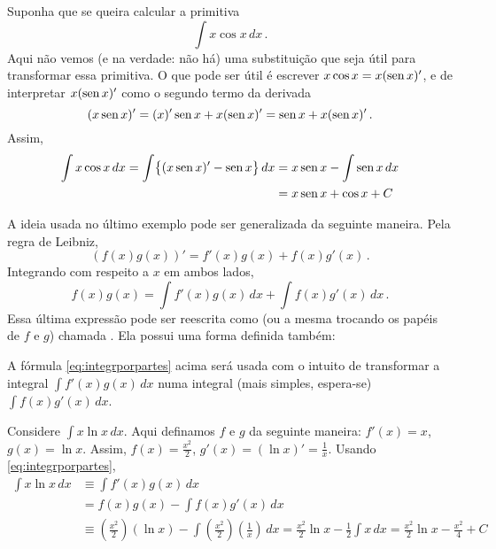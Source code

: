 \begin{ex}
Suponha que se queira calcular a primitiva
$$\int x\cos x\,dx\,.$$
Aqui não vemos (e na verdade: não há) uma substituição que seja útil para
transformar essa primitiva.
O que pode ser útil é escrever $x\cos x=x(\operatorname{sen} x)'$, e de interpretar
$x(\operatorname{sen} x)'$ como o segundo termo da derivada
$$(x\operatorname{sen} x)'=(x)'\operatorname{sen} x+x(\operatorname{sen} x)'=\operatorname{sen} x+x(\operatorname{sen} x)'\,.$$
Assim,
\begin{align*}
\int x\cos x\,dx=\int\bigl\{(x\operatorname{sen} x)'-\operatorname{sen} x\bigr\}\,dx&=
x\operatorname{sen} x-\int\operatorname{sen} x\,dx\\
&=x\operatorname{sen} x+\cos x+C
\end{align*}
\end{ex}
A ideia usada no último exemplo pode ser generalizada da seguinte maneira. Pela
regra de Leibniz,
$$(f(x)g(x))'=f'(x)g(x)+f(x)g'(x)\,.$$
Integrando com respeito a $x$ em ambos lados,
$$
f(x)g(x)=\int f'(x)g(x)\,dx+\int f(x)g'(x)\,dx\,.
$$
Essa última expressão pode ser reescrita como
(ou a mesma trocando os papéis de $f$ e $g$)
chamada . Ela possui uma forma definida
também:

A fórmula \eqref{eq:integrporpartes} acima será usada com o intuito de
transformar a integral $\int f'(x)g(x)\,dx$ numa integral (mais simples,
espera-se) $\int f(x)g'(x)\,dx$.

\begin{ex}
Considere $\int x\ln x\,dx$. Aqui definamos $f$ e $g$ da seguinte maneira:
$f'(x)=x$, $g(x)=\ln x$. Assim, $f(x)=\tfrac{x^2}{2}$, $g'(x)=(\ln
x)'=\tfrac{1}{x}$. Usando \eqref{eq:integrporpartes},
\begin{align*}
\int x\ln x\,dx&\equiv \int f'(x)g(x)\,dx\\
&=f(x)g(x)-\int f(x)g'(x)\,dx\\
&\equiv (\tfrac{x^2}{2})(\ln x)-\int (\tfrac{x^2}{2})(\tfrac1x)\,dx=
\tfrac{x^2}{2}\ln x-\tfrac12\int x\,dx=\tfrac{x^2}{2}\ln x-\tfrac{x^2}{4}+C\,
\end{align*}
\end{ex}



